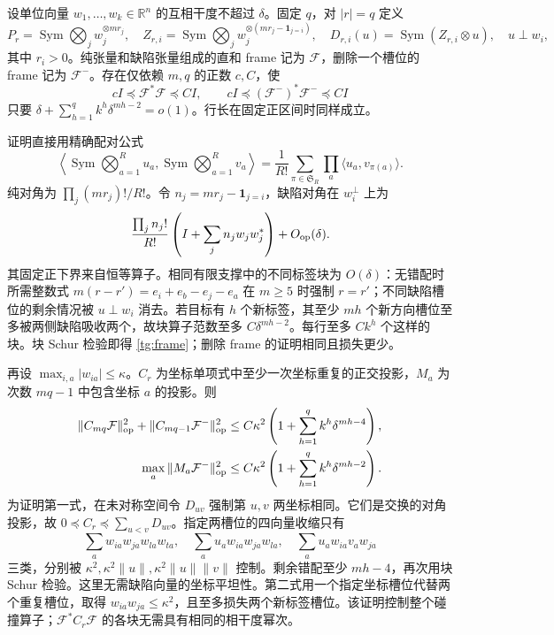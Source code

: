 \documentclass[a4paper]{tufte-handout}
\begin{document}
\begin{fullwidth}
设单位向量 $w_1,\ldots,w_k\in\mathbb R^n$ 的互相干度不超过 $\delta$。固定 $q$，对 $|r|=q$ 定义
\[
 P_r=\operatorname{Sym}\bigotimes_jw_j^{\otimes mr_j},\quad
 Z_{r,i}=\operatorname{Sym}\bigotimes_jw_j^{\otimes(mr_j-\mathbf1_{j=i})},\quad
 D_{r,i}(u)=\operatorname{Sym}(Z_{r,i}\otimes u),\quad u\perp w_i,
\]
其中 $r_i>0$。纯张量和缺陷张量组成的直和 frame 记为 $\mathcal F$，删除一个槽位的 frame 记为 $\mathcal F^-$。存在仅依赖 $m,q$ 的正数 $c,C$，使
\begin{equation}\label{tg:frame}
 cI\preceq\mathcal F^*\mathcal F\preceq CI,\qquad
 cI\preceq(\mathcal F^-)^*\mathcal F^-\preceq CI
\end{equation}
只要 $\delta+\sum_{h=1}^qk^h\delta^{mh-2}=o(1)$。行长在固定正区间时同样成立。

证明直接用精确配对公式
\[
 \left\langle\operatorname{Sym}\bigotimes_{a=1}^Ru_a,
 \operatorname{Sym}\bigotimes_{a=1}^Rv_a\right\rangle
 =\frac1{R!}\sum_{\pi\in\mathfrak S_R}\prod_a\langle u_a,v_{\pi(a)}\rangle.\tag{TG.2}
\]
纯对角为 $\prod_j(mr_j)!/R!$。令 $n_j=mr_j-\mathbf1_{j=i}$，缺陷对角在 $w_i^\perp$ 上为
\[
 \frac{\prod_jn_j!}{R!}\left(I+\sum_jn_jw_jw_j^*\right)+O_{\rm op}(\delta).
\]
其固定正下界来自恒等算子。相同有限支撑中的不同标签块为 $O(\delta)$：无错配时所需整数式
$m(r-r')=e_i+e_b-e_j-e_a$ 在 $m\ge5$ 时强制 $r=r'$；不同缺陷槽位的剩余情况被 $u\perp w_i$ 消去。若目标有 $h$ 个新标签，其至少 $mh$ 个新方向槽位至多被两侧缺陷吸收两个，故块算子范数至多 $C\delta^{mh-2}$。每行至多 $Ck^h$ 个这样的块。块 Schur 检验即得 \eqref{tg:frame}；删除 frame 的证明相同且损失更少。

再设 $\max_{i,a}|w_{ia}|\le\kappa$。$C_r$ 为坐标单项式中至少一次坐标重复的正交投影，$M_a$ 为次数 $mq-1$ 中包含坐标 $a$ 的投影。则
\begin{align}
 \|C_{mq}\mathcal F\|_{\rm op}^2+\|C_{mq-1}\mathcal F^-\|_{\rm op}^2
 &\le C\kappa^2\left(1+\sum_{h=1}^qk^h\delta^{mh-4}\right),\label{tg:collision}\\
 \max_a\|M_a\mathcal F^-\|_{\rm op}^2
 &\le C\kappa^2\left(1+\sum_{h=1}^qk^h\delta^{mh-2}\right).\label{tg:marked}
\end{align}
为证明第一式，在未对称空间令 $D_{uv}$ 强制第 $u,v$ 两坐标相同。它们是交换的对角投影，故 $0\preceq C_r\preceq\sum_{u<v}D_{uv}$。指定两槽位的四向量收缩只有
\[
 \sum_aw_{ia}w_{ja}w_{la}w_{ta},\quad
 \sum_au_aw_{ia}w_{ja}w_{la},\quad
 \sum_au_aw_{ia}v_aw_{ja}
\]
三类，分别被 $\kappa^2,\kappa^2\|u\|,\kappa^2\|u\|\|v\|$ 控制。剩余错配至少 $mh-4$，再次用块 Schur 检验。这里无需缺陷向量的坐标平坦性。第二式用一个指定坐标槽位代替两个重复槽位，取得 $w_{ia}w_{ja}\le\kappa^2$，且至多损失两个新标签槽位。该证明控制整个碰撞算子；$\mathcal F^*C_r\mathcal F$ 的各块无需具有相同的相干度幂次。


\end{fullwidth}
\end{document}

